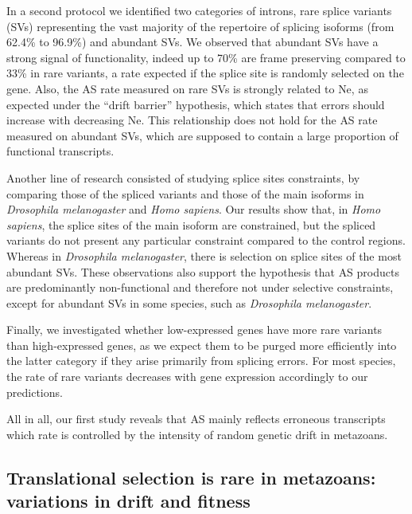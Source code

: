 In a second protocol we identified two categories of introns, rare splice variants (\acrshort{SV}s) representing the vast majority of the repertoire of splicing isoforms (from 62.4\% to 96.9\%) and abundant \acrshort{SV}s.
We observed that abundant \acrshort{SV}s have a strong signal of functionality, indeed up to 70\% are frame preserving compared to 33\% in rare variants, a rate expected if the splice site is randomly selected on the gene. Also, the \acrshort{AS} rate measured on rare \acrshort{SV}s is strongly related to \acrshort{Ne}, as expected under the “drift barrier” hypothesis, which states that errors should increase with decreasing \acrshort{Ne}. This relationship does not hold for the \acrshort{AS} rate measured on abundant \acrshort{SV}s, which are supposed to contain a large proportion of functional transcripts.

Another line of research consisted of studying splice sites constraints, by comparing those of the spliced variants and those of the main isoforms in \textit{Drosophila melanogaster} and \textit{Homo sapiens}. Our results show that, in \textit{Homo sapiens}, the splice sites of the main isoform are constrained, but the spliced variants do not present any particular constraint compared to the control regions. Whereas in \textit{Drosophila melanogaster}, there is selection on splice sites of the most abundant \acrshort{SV}s. These observations also support the hypothesis that \acrshort{AS} products are predominantly non-functional and therefore not under selective constraints, except for abundant \acrshort{SV}s in some species, such as \textit{Drosophila melanogaster}.

Finally, we investigated whether low-expressed genes have more rare variants than high-expressed genes, as we expect them to be purged more efficiently into the latter category if they arise primarily from splicing errors. For most species, the rate of rare variants decreases with gene expression accordingly to our predictions.

All in all, our first study reveals that \acrshort{AS} mainly reflects erroneous transcripts which rate is controlled by the intensity of random  \gls{genetic drift} in metazoans.


\subsection[Translational selection is rare in metazoans: variations in drift and fitness]{Translational selection is rare in metazoans:\\variations in drift and fitness}

